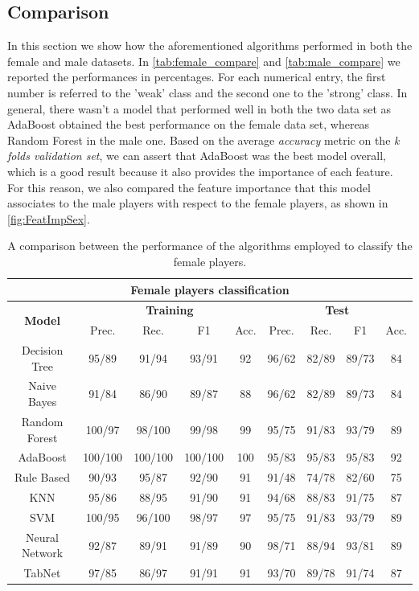 \subsection{Comparison} \label{subsect:comparison}
In this section we show how the aforementioned algorithms performed in both the female and male datasets. In \autoref{tab:female_compare} and \autoref{tab:male_compare} we reported the performances in percentages. For each numerical entry, the first number is referred to the 'weak' class and the second one to the 'strong' class. In general, there wasn't a model that performed well in both the two data set as AdaBoost obtained the best performance on the female data set, whereas Random Forest in the male one. Based on the average \textit{accuracy} metric on the \textit{k folds validation set}, we can assert that AdaBoost was the best model overall, which is a good result because it also provides the importance of each feature. For this reason, we also compared the feature importance that this model associates to the male players with respect to the female players, as shown in \autoref{fig:FeatImpSex}.

\begin{table}[H]
\footnotesize
\centering
\begin{tabular}{c|c|c|c|c|c|c|c|c}\hline \hline
\multicolumn{9}{c}{\textbf{Female players classification}}\\ \hline \hline
\multirow{2}{*}{\textbf{Model}} & \multicolumn{4}{c|}{\textbf{Training}} & \multicolumn{4}{c}{\textbf{Test}} \\\cline{2-9}
& Prec. & Rec. & F1 & Acc. & Prec. & Rec. & F1 & Acc. \\\hline
Decision Tree & 95/89 & 91/94 & 93/91 & 92 & 96/62 & 82/89 & 89/73 & 84 \\
Naive Bayes & 91/84 & 86/90 & 89/87 & 88 & 96/62 & 82/89 & 89/73 & 84\\
\rowcolor{brown!50} Random Forest & 100/97 & 98/100 & 99/98 & 99 & 95/75 & 91/83 & 93/79 & 89\\
\rowcolor{yellow!70} AdaBoost & 100/100& 100/100 & 100/100 & 100 & 95/83 & 95/83 & 95/83 & 92\\
Rule Based & 90/93 & 95/87 & 92/90 & 91 & 91/48 & 74/78 & 82/60 & 75\\
KNN & 95/86 & 88/95 & 91/90 & 91 & 94/68 & 88/83 & 91/75 & 87\\
\rowcolor{brown!50} SVM & 100/95 & 96/100 & 98/97 & 97& 95/75 & 91/83 & 93/79 & 89\\
\rowcolor{gray!40} Neural Network & 92/87 & 89/91 & 91/89 & 90 & 98/71 & 88/94 & 93/81 & 89\\
TabNet & 97/85 & 86/97 & 91/91 & 91 & 93/70 & 89/78 & 91/74 & 87\\\hline \hline
\end{tabular}
\caption{A comparison between the performance of the algorithms employed to classify the female players.}
\label{tab:female_compare}
\end{table}

